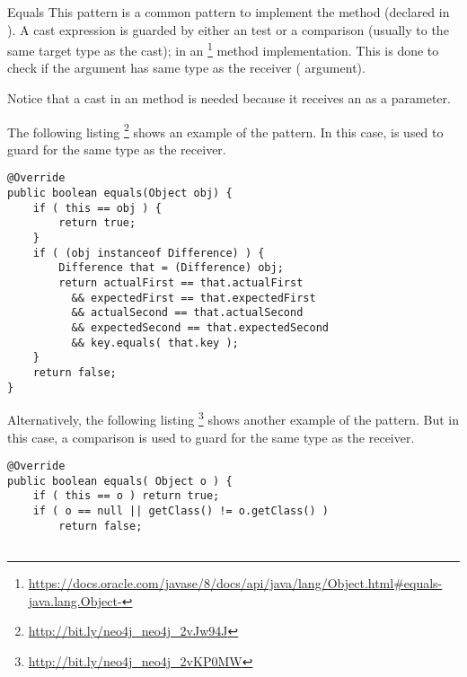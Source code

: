 \begin{pattern}{Equals}
This pattern is a common pattern to implement the  method (declared in ).
A cast expression is guarded by either an  test or a  comparison (usually to the same target type as the cast);
in an %
\footnote{\url{https://docs.oracle.com/javase/8/docs/api/java/lang/Object.html\#equals-java.lang.Object-}} method implementation.
This is done to check if the argument has same type as the receiver
( argument).

Notice that a cast in an  method is needed because it
receives an  as a parameter.

\instances{}
The following listing%
\footnote{\url{http://bit.ly/neo4j_neo4j_2vJw94J}}
shows an example of the \pname{} pattern.
In this case,
 is used to guard for the same type as the receiver.

\begin{verbatim}
@Override
public boolean equals(Object obj) {
    if ( this == obj ) {
        return true;
    }
    if ( (obj instanceof Difference) ) {
        Difference that = (Difference) obj;
        return actualFirst == that.actualFirst
          && expectedFirst == that.expectedFirst
          && actualSecond == that.actualSecond 
          && expectedSecond == that.expectedSecond
          && key.equals( that.key );
    }
    return false;
}
\end{verbatim}

Alternatively, the following listing%
\footnote{\url{http://bit.ly/neo4j_neo4j_2vKP0MW}}
shows another example of the \thisp{} pattern.
But in this case,
a  comparison is used to guard for the same type as the receiver.

\begin{verbatim}
@Override
public boolean equals( Object o ) {
    if ( this == o ) return true;
    if ( o == null || getClass() != o.getClass() )
        return false;


\end{verbatim}
\end{pattern}
